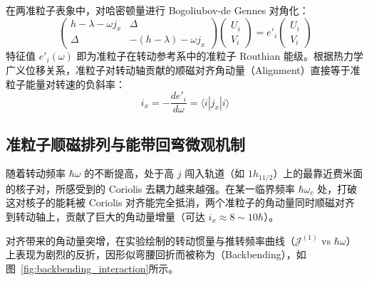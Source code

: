 在两准粒子表象中，对哈密顿量进行 Bogoliubov-de Gennes 对角化：
\begin{equation}
    \begin{pmatrix} h - \lambda - \omega j_x & \Delta \\ \Delta & -(h - \lambda) - \omega j_x \end{pmatrix} \begin{pmatrix} U_i \\ V_i \end{pmatrix} = e'_i \begin{pmatrix} U_i \\ V_i \end{pmatrix}
    \label{eq:hfb_cranking}
\end{equation}
特征值 $e'_i(\omega)$ 即为准粒子在转动参考系中的准粒子 Routhian 能级。根据热力学广义位移关系，准粒子对转动轴贡献的顺磁对齐角动量（Alignment）直接等于准粒子能量对转速的负斜率：
\begin{equation}
    i_x = -\frac{d e'_i}{d\omega} = \langle i | j_x | i \rangle
    \label{eq:alignment_formula}
\end{equation}

\subsection{准粒子顺磁排列与能带回弯微观机制}

随着转动频率 $\hbar\omega$ 的不断提高，处于高 $j$ 闯入轨道（如 $1h_{11/2}$）上的最靠近费米面的核子对，所感受到的 Coriolis 去耦力越来越强。在某一临界频率 $\hbar\omega_c$ 处，打破这对核子的能耗被 Coriolis 对齐能完全抵消，两个准粒子的角动量同时顺磁对齐到转动轴上，贡献了巨大的角动量增量（可达 $i_x \approx 8 \sim 10\hbar$）。

对齐带来的角动量突增，在实验绘制的转动惯量与推转频率曲线（$\mathcal{J}^{(1)}$ vs $\hbar\omega$）上表现为剧烈的反折，因形似弯腰回折而被称为（Backbending），如图~\ref{fig:backbending_interaction}所示。

